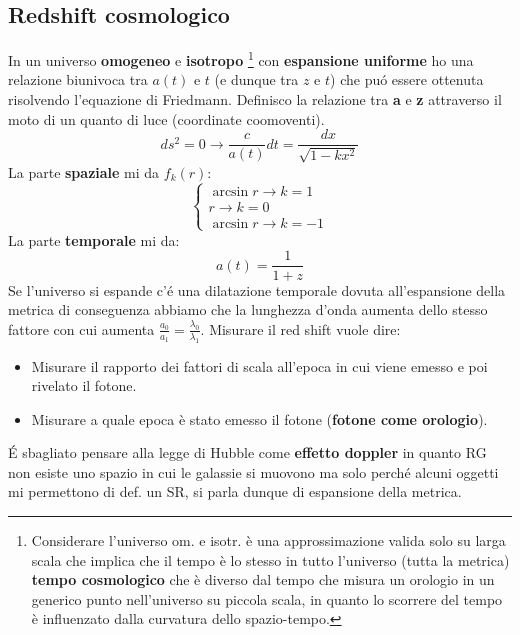\documentclass[12pt, a4paper]{article}
\begin{document}
\subsection{Redshift cosmologico}
In un universo \textbf{omogeneo} e \textbf{isotropo} \footnote{Considerare l'universo om. e isotr. è una approssimazione valida solo su larga scala che implica che il tempo è lo stesso in tutto l'universo (tutta la metrica) \textbf{tempo cosmologico} che è diverso dal tempo che misura un orologio in un generico punto nell'universo su piccola scala, in quanto lo scorrere del tempo è influenzato dalla curvatura dello spazio-tempo.} con \textbf{espansione uniforme} ho una relazione biunivoca tra $a(t)$ e $t$ (e dunque tra $z$ e $t$) che pu\'{o} essere ottenuta risolvendo l'equazione di Friedmann. 
Definisco la relazione tra \textbf{a} e \textbf{z} attraverso il moto di un quanto di luce (coordinate coomoventi).
\begin{equation}
    ds^2=0 \rightarrow \frac{c}{a(t)}dt=\frac{dx}{\sqrt{1-k x^2}}
\end{equation}
La parte \textbf{spaziale} mi da $f_k(r)$:
\begin{equation}
    \begin{cases}
         \arcsin{r} \rightarrow k=1
         \\
         r \rightarrow k=0
         \\
         \arcsin{r} \rightarrow k=-1
    \end{cases}
\end{equation}
La parte \textbf{temporale} mi da:
\begin{equation}
    a(t)=\frac{1}{1+z}
\end{equation}
Se l'universo si espande c'\'{e} una dilatazione temporale dovuta all'espansione della metrica di conseguenza abbiamo che la lunghezza d'onda aumenta dello stesso fattore con cui aumenta $\frac{a_0}{a_1}=\frac{\lambda_0}{\lambda_1}$.
Misurare il red shift vuole dire:
\begin{itemize}
    \item Misurare il rapporto dei fattori di scala all'epoca in cui viene emesso e poi rivelato il fotone.
    \item Misurare a quale epoca è stato emesso il fotone (\textbf{fotone come orologio}).
\end{itemize}
\'{E} sbagliato pensare alla legge di Hubble come \textbf{effetto doppler} in quanto RG non esiste uno spazio in cui le galassie si muovono ma solo perch\'{e} alcuni oggetti mi permettono di def. un SR, si parla dunque di espansione della metrica. 
\end{document}
